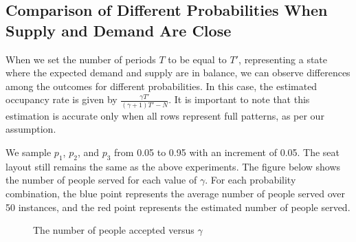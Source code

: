 \subsection{Comparison of Different Probabilities When Supply and Demand Are Close}
When we set the number of periods $T$ to be equal to $T'$, representing a state where the expected demand and supply are in balance, we can observe differences among the outcomes for different probabilities. In this case, the estimated occupancy rate is given by $\frac{\gamma T'}{(\gamma+1)T' - N}$. It is important to note that this estimation is accurate only when all rows represent full patterns, as per our assumption.

We sample $p_1$, $p_2$, and $p_3$ from 0.05 to 0.95 with an increment of 0.05. The seat layout still remains the same as the above experiments. The figure below shows the number of people served for each value of $\gamma$. For each probability combination, the blue point represents the average number of people served over 50 instances, and the red point represents the estimated number of people served. 

\begin{figure}[h]
  \centering
  \caption{The number of people accepted versus $\gamma$}
\end{figure}

